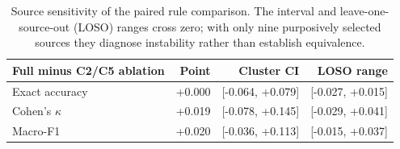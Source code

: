 \begin{table}[t]
\centering
\small
\setlength{\tabcolsep}{4pt}
\begin{tabularx}{\columnwidth}{Xrrr}
\toprule
\textbf{Full minus C2/C5 ablation} & \textbf{Point} &
\textbf{Cluster CI} & \textbf{LOSO range} \\
\midrule
Exact accuracy & +0.000 & [-0.064, +0.079] & [-0.027, +0.015] \\
Cohen's $\kappa$ & +0.019 & [-0.078, +0.145] & [-0.029, +0.041] \\
Macro-F1 & +0.020 & [-0.036, +0.113] & [-0.015, +0.037] \\
\bottomrule
\end{tabularx}
\caption{Source sensitivity of the paired rule comparison. The interval and
leave-one-source-out (LOSO) ranges cross zero; with only nine purposively
selected sources they diagnose instability rather than establish equivalence.}
\label{tab:main-source-sensitivity}
\end{table}
